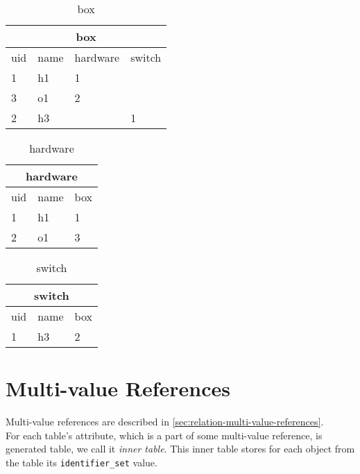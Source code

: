\documentclass[deska]{subfiles}
\begin{document}
\begin{center}

\begin{table}
    \caption{box}
    \label{tab-comp-box}
\begin{tabular}{ | l | l | l | l |}
    \hline
    \multicolumn{4}{|c|}{box}\\
    \hline
    uid & name & hardware & switch\\
    \hline
    1 & h1 & 1 & \\
    3 & o1 & 2 & \\
    2 & h3 &  & 1\\
    \hline
\end{tabular}
\end{table}

\begin{table}
    \caption{hardware}
    \label{tab-comp-hw}
\begin{tabular}{ | l | l | l | }
    \hline
    \multicolumn{3}{|c|}{hardware}\\
    \hline
    uid & name & box\\
    \hline
    1 & h1 & 1\\
    2 & o1 & 3\\
    \hline
\end{tabular}
\end{table}

\begin{table}
    \caption{switch}
    \label{tab-comp-switch}
\begin{tabular}{ | l | l | l | }
    \hline
    \multicolumn{3}{|c|}{switch}\\
    \hline
    uid & name & box\\
    \hline
    1 & h3 & 2\\
    \hline
\end{tabular}
\end{table}

\end{center}

\section{Multi-value References}
\label{sec:multi-val}
Multi-value references are described in \ref{sec:relation-multi-value-references}.\\
For each table's attribute, which is a part of some multi-value reference, is generated table, we call it {\em inner table}. This inner table stores for each object from the table its {\tt identifier\_set} value.\\
\end{document}
